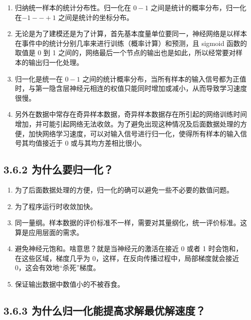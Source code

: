 \begin{enumerate}
\def\labelenumi{\arabic{enumi}.}
\item
  归纳统一样本的统计分布性。归一化在 $ 0-1$
  之间是统计的概率分布，归一化在$ -1--+1$ 之间是统计的坐标分布。
\item
  无论是为了建模还是为了计算，首先基本度量单位要同一，神经网络是以样本在事件中的统计分别几率来进行训练（概率计算）和预测，且
  sigmoid 函数的取值是 0 到 1
  之间的，网络最后一个节点的输出也是如此，所以经常要对样本的输出归一化处理。
\item
  归一化是统一在 $ 0-1 $
  之间的统计概率分布，当所有样本的输入信号都为正值时，与第一隐含层神经元相连的权值只能同时增加或减小，从而导致学习速度很慢。
\item
  另外在数据中常存在奇异样本数据，奇异样本数据存在所引起的网络训练时间增加，并可能引起网络无法收敛。为了避免出现这种情况及后面数据处理的方便，加快网络学习速度，可以对输入信号进行归一化，使得所有样本的输入信号其均值接近于
  0 或与其均方差相比很小。
\end{enumerate}

\subsection{3.6.2
为什么要归一化？}\label{ux4e3aux4ec0ux4e48ux8981ux5f52ux4e00ux5316}

\begin{enumerate}
\def\labelenumi{\arabic{enumi}.}
 
\item
  为了后面数据处理的方便，归一化的确可以避免一些不必要的数值问题。
\item
  为了程序运行时收敛加快。
\item
  同一量纲。样本数据的评价标准不一样，需要对其量纲化，统一评价标准。这算是应用层面的需求。
\item
  避免神经元饱和。啥意思？就是当神经元的激活在接近 0 或者 1
  时会饱和，在这些区域，梯度几乎为
  0，这样，在反向传播过程中，局部梯度就会接近
  0，这会有效地``杀死''梯度。
\item
  保证输出数据中数值小的不被吞食。
\end{enumerate}

\subsection{3.6.3
为什么归一化能提高求解最优解速度？}\label{ux4e3aux4ec0ux4e48ux5f52ux4e00ux5316ux80fdux63d0ux9ad8ux6c42ux89e3ux6700ux4f18ux89e3ux901fux5ea6}

